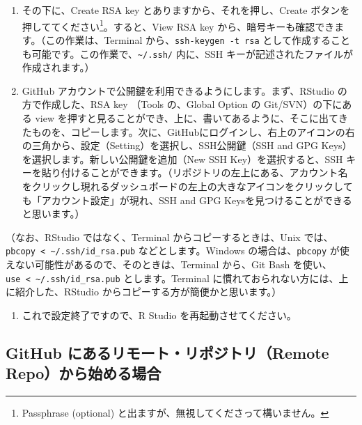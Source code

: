 \documentclass[
  xelatex, ja=standard]{bxjsbook}
\providecommand{\tightlist}{%
  \setlength{\itemsep}{0pt}\setlength{\parskip}{0pt}}
\theoremstyle{definition}
\theoremstyle{definition}
\theoremstyle{definition}
\theoremstyle{definition}
\theoremstyle{remark}
\begin{document}
\begin{enumerate}
\def\labelenumi{\arabic{enumi}.}
\setcounter{enumi}{4}
\item
  その下に、Create RSA key とありますから、それを押し、Create ボタンを押しててください\footnote{Passphrase (optional) と出ますが、無視してくださって構いません。}。すると、View RSA key から、暗号キーも確認できます。（この作業は、Terminal から、\texttt{ssh-keygen\ -t\ rsa} として作成することも可能です。この作業で、\texttt{\textasciitilde{}/.ssh/} 内に、SSH キーが記述されたファイルが作成されます。）
\item
  GitHub アカウントで公開鍵を利用できるようにします。まず、RStudio の方で作成した、RSA key （Tools の、Global Option の Git/SVN）の下にある view を押すと見ることができ、上に、書いてあるように、そこに出てきたものを、コピーします。次に、GitHubにログインし、右上のアイコンの右の三角から、設定（Setting）を選択し、SSH公開鍵（SSH and GPG Keys）を選択します。新しい公開鍵を追加（New SSH Key）を選択すると、SSH キーを貼り付けることができます。（リポジトリの左上にある、アカウント名をクリックし現れるダッシュボードの左上の大きなアイコンをクリックしても「アカウント設定」が現れ、SSH and GPG Keysを見つけることができると思います。）
\end{enumerate}

（なお、RStudio ではなく、Terminal からコピーするときは、Unix では、\texttt{pbcopy\ \textless{}\ \textasciitilde{}/.ssh/id\_rsa.pub} などとします。Windows の場合は、\texttt{pbcopy} が使えない可能性があるので、そのときは、Terminal から、Git Bash を使い、\texttt{use\ \textless{}\ \textasciitilde{}/.ssh/id\_rsa.pub} とします。Terminal に慣れておられない方には、上に紹介した、RStudio からコピーする方が簡便かと思います。）

\begin{enumerate}
\def\labelenumi{\arabic{enumi}.}
\setcounter{enumi}{6}
\tightlist
\item
  これで設定終了ですので、R Studio を再起動させてください。
\end{enumerate}

\hypertarget{github-ux306bux3042ux308bux30eaux30e2ux30fcux30c8ux30eaux30ddux30b8ux30c8ux30earemote-repoux304bux3089ux59cbux3081ux308bux5834ux5408}{%
\subsection{GitHub にあるリモート・リポジトリ（Remote Repo）から始める場合}\label{github-ux306bux3042ux308bux30eaux30e2ux30fcux30c8ux30eaux30ddux30b8ux30c8ux30earemote-repoux304bux3089ux59cbux3081ux308bux5834ux5408}}
\end{document}

